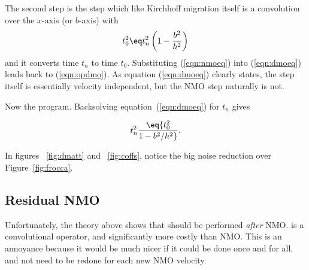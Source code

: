 The second step is the  step which
like Kirchhoff migration itself
is a convolution over the $x$-axis (or $b$-axis) with
\begin{equation}
	\label{eqn:dmoeq}
	t_0^2 \eq t_n^2 \left( 1 - {b^2 \over h^2} \right)
\end{equation}
and it converts time $t_n$ to time $t_0$.
Substituting (\ref{eqn:nmoeq}) into (\ref{eqn:dmoeq}) leads back to (\ref{eqn:opdmo}).
As equation (\ref{eqn:dmoeq}) clearly states,
the  step itself is essentially velocity independent, 
but the NMO step naturally is not. 

Now the program.
Backsolving equation~(\ref{eqn:dmoeq}) for $t_n$ gives

\begin{equation}
        \label{eqn:dmoprog}
	t_n^2 \eq
	{t_0^2 \over 1-b^2/h^2 } .
\end{equation}


In figures ~\ref{fig:dmatt} and ~\ref{fig:coffs},
notice the big noise reduction over Figure~\ref{fig:frocca}.
{}

\subsection{Residual NMO}
Unfortunately, the theory above shows
that  should be performed {\em  after} NMO.
 is a convolutional operator,
and significantly more costly than NMO.
This is an annoyance because it would
be much nicer if it could be done
once and for all, and not need to be redone for each new NMO velocity.

